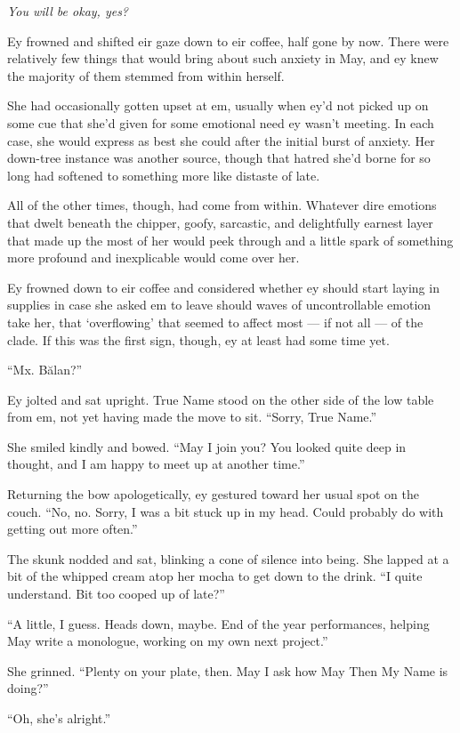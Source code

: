 \emph{You will be okay, yes?}

Ey frowned and shifted eir gaze down to eir coffee, half gone by now. There were relatively few things that would bring about such anxiety in May, and ey knew the majority of them stemmed from within herself.

She had occasionally gotten upset at em, usually when ey'd not picked up on some cue that she'd given for some emotional need ey wasn't meeting. In each case, she would express as best she could after the initial burst of anxiety. Her down-tree instance was another source, though that hatred she'd borne for so long had softened to something more like distaste of late.

All of the other times, though, had come from within. Whatever dire emotions that dwelt beneath the chipper, goofy, sarcastic, and delightfully earnest layer that made up the most of her would peek through and a little spark of something more profound and inexplicable would come over her.

Ey frowned down to eir coffee and considered whether ey should start laying in supplies in case she asked em to leave should waves of uncontrollable emotion take her, that `overflowing' that seemed to affect most — if not all — of the clade. If this was the first sign, though, ey at least had some time yet.

``Mx. Bălan?''

Ey jolted and sat upright. True Name stood on the other side of the low table from em, not yet having made the move to sit. ``Sorry, True Name.''

She smiled kindly and bowed. ``May I join you? You looked quite deep in thought, and I am happy to meet up at another time.''

Returning the bow apologetically, ey gestured toward her usual spot on the couch. ``No, no. Sorry, I was a bit stuck up in my head. Could probably do with getting out more often.''

The skunk nodded and sat, blinking a cone of silence into being. She lapped at a bit of the whipped cream atop her mocha to get down to the drink. ``I quite understand. Bit too cooped up of late?''

``A little, I guess. Heads down, maybe. End of the year performances, helping May write a monologue, working on my own next project.''

She grinned. ``Plenty on your plate, then. May I ask how May Then My Name is doing?''

``Oh, she's alright.''

